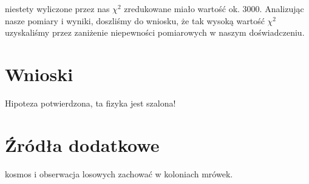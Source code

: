 \documentclass[a4paper,12pt]{article}
\begin{document}
niestety wyliczone przez nas $\chi^2$ zredukowane miało wartość ok. 3000. Analizując nasze pomiary i wyniki, doszliśmy do wniosku, że tak wysoką wartość $\chi^2$ uzyskaliśmy przez zaniżenie niepewności pomiarowych w naszym doświadczeniu.



\section{Wnioski}



{\Large Hipoteza potwierdzona, ta fizyka jest szalona! }

\section {Źródła dodatkowe}
  
 kosmos i obserwacja losowych zachować w koloniach mrówek. 
\end{document}
